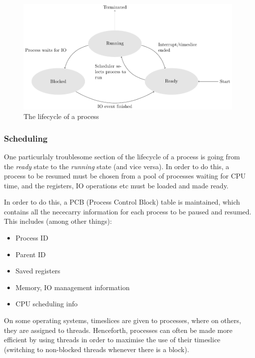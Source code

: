 \begin{figure}[ht!]
  \centering
  \includegraphics[width=\textwidth]{diagrams/process-lifecycle.pdf}
  \caption{The lifecycle of a process}
  \label{fig:proc-lifecycle}
\end{figure}

\subsubsection{Scheduling}

One particurlaly troublesome section of the lifecycle of a process is going from
the \textit{ready} state to the \textit{running} state (and vice versa). In
order to do this, a process to be resumed must be chosen from a pool of
processes waiting for CPU time, and the registers, IO operations etc must be
loaded and made ready.

In order to do this, a PCB (Process Control Block) table is maintained, which
contains all the nececarry information for each process to be paused and
resumed. This includes (among other things):

\begin{itemize}
  \item Process ID
  \item Parent ID
  \item Saved registers
  \item Memory, IO management information
  \item CPU scheduling info
\end{itemize}

On some operating systems, timeslices are given to processes, where on others,
they are assigned to threads. Henceforth, processes can often be made more
efficient by using threads in order to maximise the use of their timeslice
(switching to non-blocked threads whenever there is a block).

